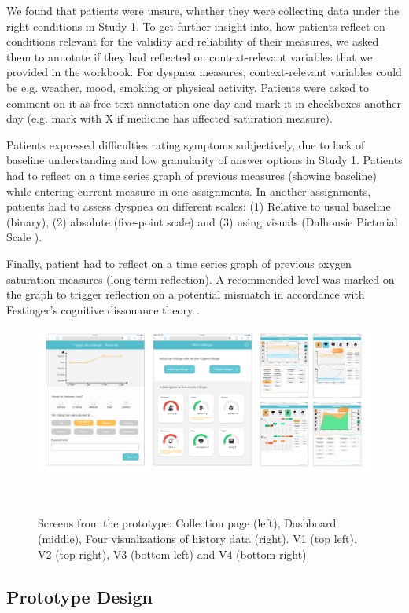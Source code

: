 We found that patients were unsure, whether they were collecting data under the right conditions in Study 1. To get further insight into, how patients reflect on conditions relevant for the validity and reliability of their measures, we asked them to annotate if they had reflected on context-relevant variables that we provided in the workbook. For dyspnea measures, context-relevant variables could be e.g. weather, mood, smoking or physical activity. Patients were asked to comment on it as free text annotation one day and mark it in checkboxes another day (e.g. mark with X if medicine has affected saturation measure).

Patients expressed difficulties rating symptoms subjectively, due to lack of baseline understanding and low granularity of answer options in Study 1. Patients had to reflect on a time series graph of previous measures (showing baseline) while entering current measure in one assignments. In another assignments, patients had to assess dyspnea on different scales: (1) Relative to usual baseline (binary), (2) absolute (five-point scale) and (3) using visuals (Dalhousie Pictorial Scale \cite{dalhousie}). 

Finally, patient had to reflect on a time series graph of previous oxygen saturation measures (long-term reflection). A recommended level was marked on the graph to trigger reflection on a potential mismatch in accordance with Festinger’s cognitive dissonance theory \cite{Rivera}.

\begin{figure}
 \centering
 \includegraphics[width=2.1\columnwidth]{img/screens}
 \caption{Screens from the prototype: Collection page (left), Dashboard (middle), Four visualizations of history data (right). V1 (top left), V2 (top right), V3 (bottom left) and V4 (bottom right)}~\label{fig:design}
\end{figure}

\subsection{Prototype Design}
